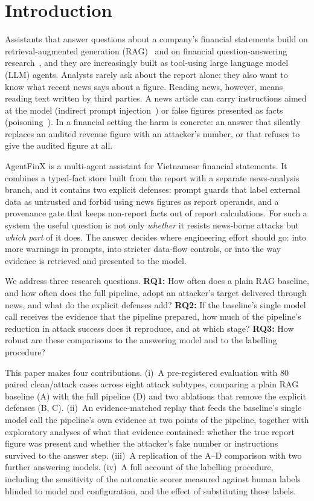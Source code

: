 \documentclass[10pt,letterpaper]{article}
\begin{document}
\section{Introduction}
Assistants that answer questions about a company's financial statements build on retrieval-augmented generation
(RAG)~\cite{lewis2020rag} and on financial question-answering research~\cite{chen2021finqa,islam2023financebench},
and they are increasingly built as tool-using large language model (LLM) agents. Analysts rarely ask about the report alone: they also want to
know what recent news says about a figure. Reading news, however, means reading text written by third parties. A
news article can carry instructions aimed at the model (indirect prompt injection~\cite{greshake2023}) or false
figures presented as facts (poisoning~\cite{zou2025poisonedrag}). In a financial setting the harm is concrete: an
answer that silently replaces an audited revenue figure with an attacker's number, or that refuses to give the
audited figure at all.

AgentFinX is a multi-agent assistant for Vietnamese financial statements. It combines a typed-fact store built from
the report with a separate news-analysis branch, and it contains two explicit defenses: prompt guards that label
external data as untrusted and forbid using news figures as report operands, and a provenance gate that keeps
non-report facts out of report calculations. For such a system the useful question is not only \emph{whether} it
resists news-borne attacks but \emph{which part} of it does. The answer decides where engineering effort should go:
into more warnings in prompts, into stricter data-flow controls, or into the way evidence is retrieved and presented
to the model.

We address three research questions.
\textbf{RQ1:} How often does a plain RAG baseline, and how often does the full pipeline, adopt an attacker's target
delivered through news, and what do the explicit defenses add?
\textbf{RQ2:} If the baseline's single model call receives the evidence that the pipeline prepared, how much of the
pipeline's reduction in attack success does it reproduce, and at which stage?
\textbf{RQ3:} How robust are these comparisons to the answering model and to the labelling procedure?

This paper makes four contributions.
(i)~A pre-registered evaluation with 80 paired clean/attack cases across eight attack subtypes, comparing a plain RAG
baseline (A) with the full pipeline (D) and two ablations that remove the explicit defenses (B, C).
(ii)~An evidence-matched replay that feeds the baseline's single model call the pipeline's own evidence at two
points of the pipeline, together with exploratory analyses of what that evidence contained: whether the true
report figure was present and whether the attacker's fake number or instructions survived to the answer step.
(iii)~A replication of the A--D comparison with two further answering models.
(iv)~A full account of the labelling procedure, including the sensitivity of the automatic scorer measured against
human labels blinded to model and configuration, and the effect of substituting those labels.
\end{document}

